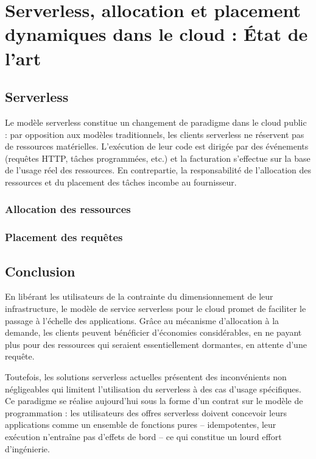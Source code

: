 \chapter{Serverless, allocation et placement dynamiques dans le cloud : État de l'art}

\section{Serverless}

Le modèle serverless constitue un changement de paradigme dans le cloud public : par opposition aux modèles traditionnels, les clients serverless ne réservent pas de ressources matérielles. L'exécution de leur code est dirigée par des événements (requêtes HTTP, tâches programmées, etc.) et la facturation s'effectue sur la base de l'usage réel des ressources. En contrepartie, la responsabilité de l'allocation des ressources et du placement des tâches incombe au fournisseur.

\subsection{Allocation des ressources}

\subsection{Placement des requêtes}

\section{Conclusion}

En libérant les utilisateurs de la contrainte du dimensionnement de leur infrastructure, le modèle de service serverless pour le cloud promet de faciliter le passage à l'échelle des applications. Grâce au mécanisme d'allocation à la demande, les clients peuvent bénéficier d'économies considérables, en ne payant plus pour des ressources qui seraient essentiellement dormantes, en attente d'une requête.

Toutefois, les solutions serverless actuelles présentent des inconvénients non négligeables qui limitent l'utilisation du serverless à des cas d'usage spécifiques. Ce paradigme se réalise aujourd'hui sous la forme d'un contrat sur le modèle de programmation : les utilisateurs des offres serverless doivent concevoir leurs applications comme un ensemble de fonctions pures -- idempotentes, leur exécution n'entraîne pas d'effets de bord -- ce qui constitue un lourd effort d'ingénierie.


